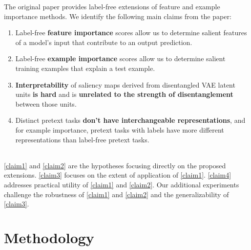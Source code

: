 

The original paper provides label-free extensions of feature and example importance methods.  
 We identify the following main claims from the paper:
\begin{enumerate}[labelindent=\parindent,leftmargin=*, label=\textbf{Claim \arabic*},noitemsep,topsep=0pt]
    \itemsep0em
    \item\label{claim1}Label-free \textbf{feature importance} scores allow us to determine salient features of a model's input that contribute to an output prediction.
    \item\label{claim2}Label-free \textbf{example importance} scores allow us to determine salient training examples that explain a test example.
    \item\label{claim3} \textbf{Interpretability} of saliency maps derived from disentangled VAE latent units \textbf{is hard} and is \textbf{unrelated to the strength of disentanglement} between those units.
    \item\label{claim4} Distinct pretext tasks \textbf{don't have interchangeable representations}, and for example importance, pretext tasks with labels have more different representations than label-free pretext tasks.
\end{enumerate}
\  \\
\ref{claim1} and \ref{claim2} are the hypotheses focusing directly on the proposed extensions. \ref{claim3} focuses on the extent of application of \ref{claim1}. \ref{claim4} addresses practical utility of \ref{claim1} and \ref{claim2}. Our additional experiments challenge the robustness of \ref{claim1} and \ref{claim2} and the generalizability of \ref{claim3}.


\section{Methodology}
\label{section:methodology}

